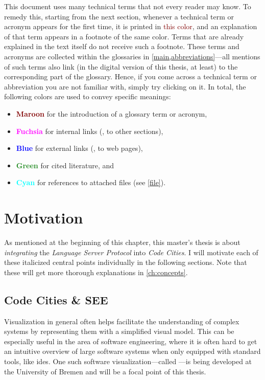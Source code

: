 \documentclass[../thesis]{subfiles}
\begin{document}
This document uses many technical terms that not every reader may know.
To remedy this, starting from the next section, whenever a technical term or acronym appears for the first time, it is printed in {\textcolor{Maroon}{this color}}, and an explanation of that term appears in a footnote of the same color.
Terms that are already explained in the text itself do not receive such a footnote.
These terms and acronyms are collected within the glossaries in \cref{main,abbreviations}---all mentions of such terms also link (in the digital version of this thesis, at least) to the corresponding part of the glossary.
Hence, if you come across a technical term or abbreviation you are not familiar with, simply try clicking on it.
In total, the following colors are used to convey specific meanings:
\begin{itemize}
	\item \textbf{\textcolor{Maroon}{Maroon}} for the introduction of a glossary term or acronym,
	\item \textbf{\textcolor{Fuchsia}{Fuchsia}} for internal links (\eg, to other sections),
	\item \textbf{\textcolor{Blue}{Blue}} for external links (\eg, to web pages),
	\item \textbf{\textcolor{ForestGreen}{Green}} for cited literature, and
	\item \textbf{\textcolor{Cyan}{Cyan}} for references to attached files (see \cref{file}).
\end{itemize}

\section{Motivation}
As mentioned at the beginning of this chapter, this master's thesis is about \emph{integrating} the \emph{Language Server Protocol} into \emph{Code Cities}.
I will motivate each of these italicized central points individually in the following sections.
Note that these will get more thorough explanations in \cref{ch:concepts}.

\subsection{Code Cities \& SEE}\label{subsec:see}
Visualization in general often helps facilitate the understanding of complex systems by representing them with a simplified visual model.
This can be especially useful in the area of software engineering, where it is often hard to get an intuitive overview of large software systems when only equipped with standard tools, like \glspl{ide}.
One such software visualization---called \SEE{}---is being developed at the University of Bremen and will be a focal point of this thesis.
\end{document}
